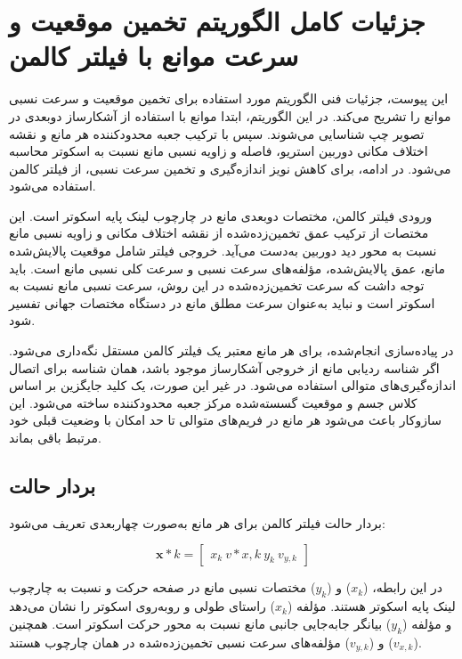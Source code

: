 \chapter{جزئیات کامل الگوریتم تخمین موقعیت و سرعت موانع با فیلتر کالمن}
\label{appendix:kalman_speed}

این پیوست، جزئیات فنی الگوریتم مورد استفاده برای تخمین موقعیت و سرعت نسبی موانع را تشریح می‌کند. در این الگوریتم، ابتدا موانع با استفاده از آشکارساز دوبعدی در تصویر چپ شناسایی می‌شوند. سپس با ترکیب جعبه محدودکننده هر مانع و نقشه اختلاف مکانی دوربین استریو، فاصله و زاویه نسبی مانع نسبت به اسکوتر محاسبه می‌شود. در ادامه، برای کاهش نویز اندازه‌گیری و تخمین سرعت نسبی، از فیلتر کالمن استفاده می‌شود.

ورودی فیلتر کالمن، مختصات دوبعدی مانع در چارچوب لینک پایه اسکوتر است. این مختصات از ترکیب عمق تخمین‌زده‌شده از نقشه اختلاف مکانی و زاویه نسبی مانع نسبت به محور دید دوربین به‌دست می‌آید. خروجی فیلتر شامل موقعیت پالایش‌شده مانع، عمق پالایش‌شده، مؤلفه‌های سرعت نسبی و سرعت کلی نسبی مانع است. باید توجه داشت که سرعت تخمین‌زده‌شده در این روش، سرعت نسبی مانع نسبت به اسکوتر است و نباید به‌عنوان سرعت مطلق مانع در دستگاه مختصات جهانی تفسیر شود.

در پیاده‌سازی انجام‌شده، برای هر مانع معتبر یک فیلتر کالمن مستقل نگه‌داری می‌شود. اگر شناسه ردیابی مانع از خروجی آشکارساز موجود باشد، همان شناسه برای اتصال اندازه‌گیری‌های متوالی استفاده می‌شود. در غیر این صورت، یک کلید جایگزین بر اساس کلاس جسم و موقعیت گسسته‌شده مرکز جعبه محدودکننده ساخته می‌شود. این سازوکار باعث می‌شود هر مانع در فریم‌های متوالی تا حد امکان با وضعیت قبلی خود مرتبط باقی بماند.

\section{بردار حالت}

بردار حالت فیلتر کالمن برای هر مانع به‌صورت چهاربعدی تعریف می‌شود:

\begin{equation}
	\mathbf{x}*k =
	\begin{bmatrix}
		x_k \
		v*{x,k} \
		y_k \
		v_{y,k}
	\end{bmatrix}
	\label{eq:app_kalman_state}
\end{equation}

در این رابطه، ($x_k$) و ($y_k$) مختصات نسبی مانع در صفحه حرکت و نسبت به چارچوب لینک پایه اسکوتر هستند. مؤلفه ($x_k$) راستای طولی و روبه‌روی اسکوتر را نشان می‌دهد و مؤلفه ($y_k$) بیانگر جابه‌جایی جانبی مانع نسبت به محور حرکت اسکوتر است. همچنین ($v_{x,k}$) و ($v_{y,k}$) مؤلفه‌های سرعت نسبی تخمین‌زده‌شده در همان چارچوب هستند.


